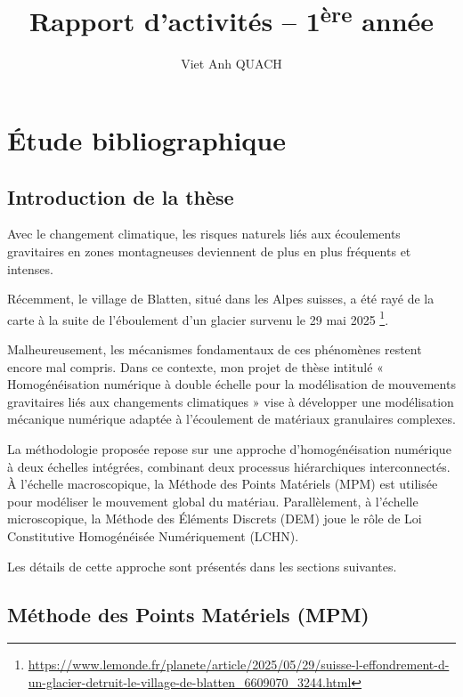 \documentclass[a4paper,12pt]{report}
\title{Rapport d'activités -- 1\textsuperscript{ère} année}
\author{Viet Anh QUACH}
\begin{document}
\maketitle
\tableofcontents



\chapter{Étude bibliographique}
\section{Introduction de la thèse}
Avec le changement climatique, les risques naturels liés aux écoulements gravitaires en zones montagneuses deviennent de plus en plus fréquents et intenses.  


Récemment, le village de Blatten, situé dans les Alpes suisses, a été rayé de la carte à la suite de l’éboulement d’un glacier survenu le 29 mai 2025 \footnote{\url{https://www.lemonde.fr/planete/article/2025/05/29/suisse-l-effondrement-d-un-glacier-detruit-le-village-de-blatten_6609070_3244.html}}.  

Malheureusement, les mécanismes fondamentaux de ces phénomènes restent encore mal compris.  
Dans ce contexte, mon projet de thèse intitulé « Homogénéisation numérique à double échelle pour la modélisation de mouvements gravitaires liés aux changements climatiques » vise à développer une modélisation mécanique numérique adaptée à l’écoulement de matériaux granulaires complexes.

La méthodologie proposée repose sur une approche d’homogénéisation numérique à deux échelles intégrées, combinant deux processus hiérarchiques interconnectés.  
À l’échelle macroscopique, la Méthode des Points Matériels (MPM) est utilisée pour modéliser le mouvement global du matériau.  
Parallèlement, à l’échelle microscopique, la Méthode des Éléments Discrets (DEM) joue le rôle de Loi Constitutive Homogénéisée Numériquement (LCHN).  

Les détails de cette approche sont présentés dans les sections suivantes.

\section{Méthode des Points Matériels (MPM)}
\end{document}
